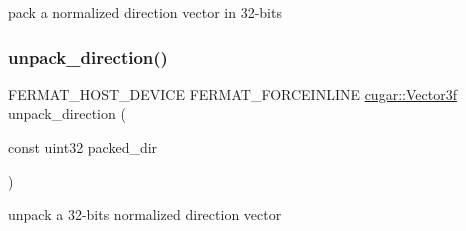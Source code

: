 pack a normalized direction vector in 32-\/bits \mbox{\label{group___vertex_geometry_module_gab56236f4d0e367a082d3dc83df137d79}} 
\subsubsection{\texorpdfstring{unpack\+\_\+direction()}{unpack\_direction()}}
{\footnotesize\ttfamily F\+E\+R\+M\+A\+T\+\_\+\+H\+O\+S\+T\+\_\+\+D\+E\+V\+I\+CE F\+E\+R\+M\+A\+T\+\_\+\+F\+O\+R\+C\+E\+I\+N\+L\+I\+NE \hyperlink{structcugar_1_1_vector}{cugar\+::\+Vector3f} unpack\+\_\+direction (\begin{DoxyParamCaption}\item[{const uint32}]{packed\+\_\+dir }\end{DoxyParamCaption})}

unpack a 32-\/bits normalized direction vector 